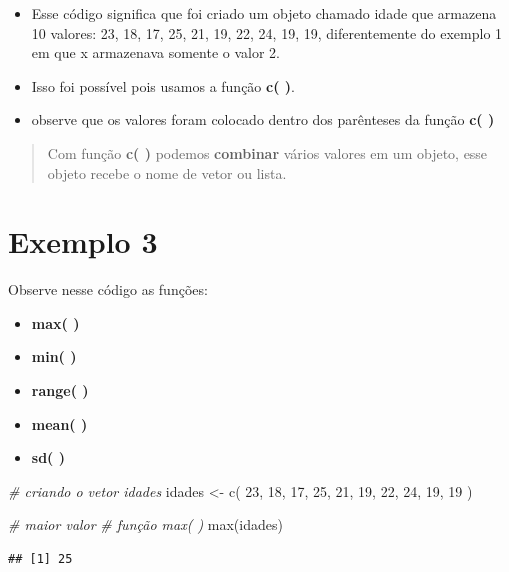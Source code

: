 \documentclass[
]{book}
\newenvironment{Shaded}{\begin{snugshade}}{\end{snugshade}}
\newcommand{\CommentTok}[1]{\textcolor[rgb]{0.56,0.35,0.01}{\textit{#1}}}
\newcommand{\DecValTok}[1]{\textcolor[rgb]{0.00,0.00,0.81}{#1}}
\newcommand{\FunctionTok}[1]{\textcolor[rgb]{0.00,0.00,0.00}{#1}}
\newcommand{\NormalTok}[1]{#1}
\newcommand{\OtherTok}[1]{\textcolor[rgb]{0.56,0.35,0.01}{#1}}
\begin{document}
\begin{itemize}
\item
  Esse código significa que foi criado um objeto chamado idade que armazena 10 valores: 23, 18, 17, 25, 21, 19, 22, 24, 19, 19, diferentemente do exemplo 1 em que x armazenava somente o valor 2.
\item
  Isso foi possível pois usamos a função \textbf{c( )}.
\item
  observe que os valores foram colocado dentro dos parênteses da função \textbf{c( )}
\end{itemize}

\begin{quote}
Com função \textbf{c( )} podemos \textbf{combinar} vários valores em um objeto, esse objeto recebe o nome de vetor ou lista.
\end{quote}

\hypertarget{exemplo-3}{%
\section{Exemplo 3}\label{exemplo-3}}

Observe nesse código as funções:

\begin{itemize}
\item
  \textbf{max( )}
\item
  \textbf{min( )}
\item
  \textbf{range( )}
\item
  \textbf{mean( )}
\item
  \textbf{sd( )}
\end{itemize}

\begin{Shaded}
\begin{Highlighting}[]
\CommentTok{\# criando o vetor idades }
\NormalTok{idades }\OtherTok{\textless{}{-}} \FunctionTok{c}\NormalTok{( }\DecValTok{23}\NormalTok{, }\DecValTok{18}\NormalTok{, }\DecValTok{17}\NormalTok{, }\DecValTok{25}\NormalTok{, }\DecValTok{21}\NormalTok{, }\DecValTok{19}\NormalTok{, }\DecValTok{22}\NormalTok{, }\DecValTok{24}\NormalTok{, }\DecValTok{19}\NormalTok{, }\DecValTok{19}\NormalTok{ )}

\CommentTok{\# maior valor}
\CommentTok{\# função max( )}
\FunctionTok{max}\NormalTok{(idades)}
\end{Highlighting}
\end{Shaded}

\begin{verbatim}
## [1] 25
\end{verbatim}
\end{document}
